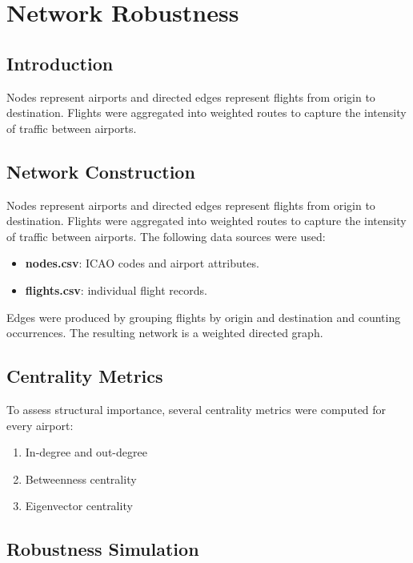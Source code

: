 \documentclass[9pt]{article}
\begin{document}
\section{Network Robustness}

\subsection{Introduction}

Nodes represent airports and directed edges represent flights from origin to destination. Flights were aggregated into weighted routes to capture the intensity of traffic between airports.

\subsection{Network Construction}

Nodes represent airports and directed edges represent flights from origin to destination. Flights were aggregated into weighted routes to capture the intensity of traffic between airports. The following data sources were used:

\begin{itemize}
    \item \textbf{nodes.csv}: ICAO codes and airport attributes.
    \item \textbf{flights.csv}: individual flight records.
\end{itemize}

Edges were produced by grouping flights by origin and destination and counting occurrences. The resulting network is a weighted directed graph.

\subsection{Centrality Metrics}

To assess structural importance, several centrality metrics were computed for every airport:

\begin{enumerate}[label=\arabic*.]
    \item In-degree and out-degree
    \item Betweenness centrality
    \item Eigenvector centrality
\end{enumerate}

\subsection{Robustness Simulation}
\end{document}
